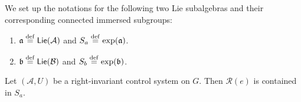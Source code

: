 \documentclass[12pt,class=article,crop=false]{standalone}
\begin{document}
\begin{defn}
We set up the notations for the following two Lie subalgebras and their corresponding connected immersed subgroups:
\begin{enumerate}[label=(\roman*)]
	\item $ \mathfrak{a} \stackrel{\mathrm{def}}{=}  \mathsf{Lie}( \mathcal{ A})$ and $ S_a \stackrel{\mathrm{def}}{=}  \exp( \mathfrak{a} )$.
	\item  $ \mathfrak{b} \stackrel{\mathrm{def}}{=}  \mathsf{Lie}( \mathcal{ B}) $ and $ S_b \stackrel{\mathrm{def}}{=}  \exp( \mathfrak{b} )$.
\end{enumerate}
\end{defn}


\begin{lemma} \label{lem:subset} 
Let $ (\mathcal{A},U)$ be a right-invariant control system on $G$. Then $ \mathcal{R}( e) $ is contained in $ S_a$.
\end{lemma}
\end{document}

